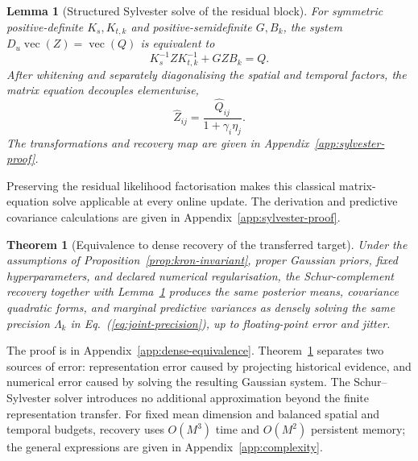 \documentclass[twoside]{article}
\newtheorem{lemma}{Lemma}
\newtheorem{theorem}{Theorem}
\begin{document}
\begin{lemma}[Structured Sylvester solve of the residual block]
\label{lem:sylvester}
For symmetric positive-definite $K_s,K_{t,k}$ and positive-semidefinite $G,B_k$, the system
$D_u\operatorname{vec}(Z)=\operatorname{vec}(Q)$ is equivalent to
\begin{equation}
 K_s^{-1}ZK_{t,k}^{-1}+GZB_k=Q.
 \label{eq:sylvester}
\end{equation}
After whitening and separately diagonalising the spatial and temporal factors,
the matrix equation decouples elementwise,
\begin{equation}
 \widehat Z_{ij}=\frac{\widehat Q_{ij}}{1+\gamma_i\eta_j}.
 \label{eq:sylvester-solution}
\end{equation}
The transformations and recovery map are given in Appendix~\ref{app:sylvester-proof}.
\end{lemma}
Preserving the residual likelihood factorisation makes this classical matrix-equation solve applicable at every online update. The derivation and predictive covariance calculations are given in Appendix~\ref{app:sylvester-proof}.

\begin{theorem}[Equivalence to dense recovery of the transferred target]
\label{thm:dense-equivalence}
Under the assumptions of Proposition~\ref{prop:kron-invariant}, proper Gaussian priors, fixed hyperparameters, and declared numerical regularisation, the Schur-complement recovery together with Lemma~\ref{lem:sylvester} produces the same posterior means, covariance quadratic forms, and marginal predictive variances as densely solving the same precision $\Lambda_k$ in Eq.~(\ref{eq:joint-precision}), up to floating-point error and jitter.
\end{theorem}
The proof is in Appendix~\ref{app:dense-equivalence}. Theorem~\ref{thm:dense-equivalence} separates two sources of error: representation error caused by projecting historical evidence, and numerical error caused by solving the resulting Gaussian system. The Schur--Sylvester solver introduces no additional approximation beyond the finite representation transfer. For fixed mean dimension and balanced spatial and temporal budgets, recovery uses $O(M^3)$ time and $O(M^2)$ persistent memory; the general expressions are given in Appendix~\ref{app:complexity}.
\end{document}
